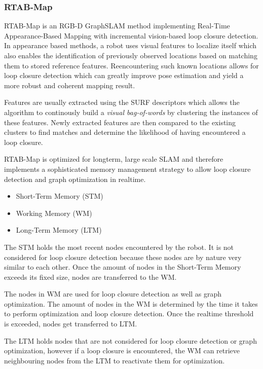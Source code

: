 \documentclass[10pt,journal,compsoc]{IEEEtran}
\begin{document}
\subsubsection{RTAB-Map}
RTAB-Map is an RGB-D GraphSLAM method implementing Real-Time Appearance-Based Mapping with incremental vision-based loop closure detection. In appearance based methods, a robot uses visual features to localize itself which also enables the identification of previously observed locations based on matching them to stored reference features. Reencountering such known locations allows for loop closure detection which can greatly improve pose estimation and yield a more robust and coherent mapping result.

Features are usually extracted using the SURF\cite{leonardis_surf:_2006} descriptors which allows the algorithm to continously build a \textit{visual bag-of-words} by clustering the instances of these features. Newly extracted features are then compared to the existing clusters to find matches and determine the likelihood of having encountered a loop closure.

RTAB-Map is optimized for longterm, large scale SLAM and therefore implements a sophisticated memory management strategy to allow loop closure detection and graph optimization in realtime.
\begin{itemize}
    \item Short-Term Memory (STM)
    \item Working Memory (WM)
    \item Long-Term Memory (LTM)
\end{itemize}
The STM holds the most recent nodes encountered by the robot. It is not considered for loop closure detection because these nodes are by nature very similar to each other. Once the amount of nodes in the Short-Term Memory exceeds its fixed size, nodes are transferred to the WM.

The nodes in WM are used for loop closure detection as well as graph optimization. The amount of nodes in the WM is determined by the time it takes to perform optimization and loop closure detection. Once the realtime threshold is exceeded, nodes get transferred to LTM.

The LTM holds nodes that are not considered for loop closure detection or graph optimization, however if a loop closure is encountered, the WM can retrieve neighbouring nodes from the LTM to reactivate them for optimization.

\end{document}
